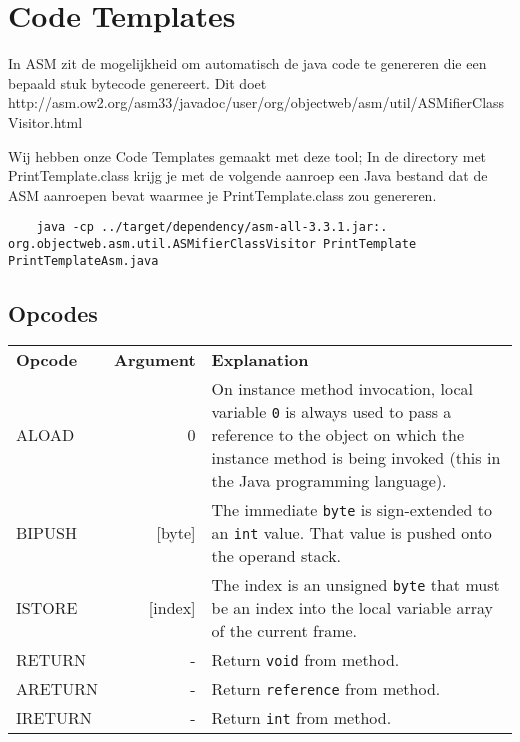 \section{Code Templates}
In ASM zit de mogelijkheid om automatisch de java code te genereren die een bepaald stuk bytecode genereert.
Dit doet http://asm.ow2.org/asm33/javadoc/user/org/objectweb/asm/util/ASMifierClassVisitor.html

Wij hebben onze Code Templates gemaakt met deze tool; In de directory met PrintTemplate.class krijg je met de volgende aanroep een Java bestand dat de ASM aanroepen bevat waarmee je PrintTemplate.class zou genereren.
\begin{verbatim}
	java -cp ../target/dependency/asm-all-3.3.1.jar:. org.objectweb.asm.util.ASMifierClassVisitor PrintTemplate PrintTemplateAsm.java
\end{verbatim}

\subsection{Opcodes}
\begin{tabular*}{0.75 \textwidth}{|l| r | p|}
	\hline
	\textbf{Opcode}	&	\textbf{Argument}	& \textbf{Explanation}	\\
	ALOAD		&	0			& On instance method invocation, local variable \verb+0+ is always used to pass a reference to the object on which the instance method is being invoked (this in the Java programming language).	\\
	BIPUSH		&	[byte]			& The immediate \verb+byte+ is sign-extended to an \verb+int+ value. That value is pushed onto the operand stack. \\
	ISTORE		&	[index]			& The index is an unsigned \verb+byte+ that must be an index into the local variable array of the current frame. \\
	RETURN		&	-			& Return \verb+void+ from method. \\
	ARETURN		&	-			& Return \verb+reference+ from method. \\
	IRETURN		&	-			& Return \verb+int+ from method. \\
\end{tabular*}
